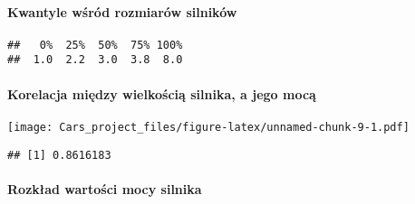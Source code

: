 \documentclass[
]{article}
\newenvironment{Shaded}{\begin{snugshade}}{\end{snugshade}}
\newcommand{\AttributeTok}[1]{\textcolor[rgb]{0.77,0.63,0.00}{#1}}
\newcommand{\CommentTok}[1]{\textcolor[rgb]{0.56,0.35,0.01}{\textit{#1}}}
\newcommand{\FunctionTok}[1]{\textcolor[rgb]{0.00,0.00,0.00}{#1}}
\newcommand{\NormalTok}[1]{#1}
\newcommand{\OtherTok}[1]{\textcolor[rgb]{0.56,0.35,0.01}{#1}}
\newcommand{\SpecialCharTok}[1]{\textcolor[rgb]{0.00,0.00,0.00}{#1}}
\newcommand{\StringTok}[1]{\textcolor[rgb]{0.31,0.60,0.02}{#1}}
\begin{document}
\hypertarget{kwantyle-wux15bruxf3d-rozmiaruxf3w-silnikuxf3w}{%
\paragraph{Kwantyle wśród rozmiarów
silników}\label{kwantyle-wux15bruxf3d-rozmiaruxf3w-silnikuxf3w}}

\begin{Shaded}
\end{Shaded}

\begin{verbatim}
##   0%  25%  50%  75% 100% 
##  1.0  2.2  3.0  3.8  8.0
\end{verbatim}

\hypertarget{korelacja-miux119dzy-wielkoux15bciux105-silnika-a-jego-mocux105}{%
\paragraph{Korelacja między wielkością silnika, a jego
mocą}\label{korelacja-miux119dzy-wielkoux15bciux105-silnika-a-jego-mocux105}}

\begin{Shaded}
\end{Shaded}

\texttt{[image: Cars\_project\_files/figure-latex/unnamed-chunk-9-1.pdf]}

\begin{verbatim}
## [1] 0.8616183
\end{verbatim}

\hypertarget{rozkux142ad-wartoux15bci-mocy-silnika}{%
\paragraph{Rozkład wartości mocy
silnika}\label{rozkux142ad-wartoux15bci-mocy-silnika}}
\end{document}
